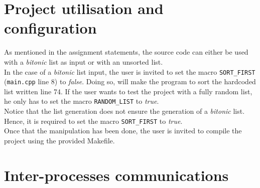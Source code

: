 \documentclass[a4paper,11pt]{article}
\begin{document}
\section{Project utilisation and configuration}

  As mentioned in the assignment statements, the source code can either be used with a \textit{bitonic} list as input or with an unsorted list.\\
  In the case of a \textit{bitonic} list input, the user is invited to set the macro \verb|SORT_FIRST| (\verb|main.cpp| line 8) to \textit{false}. Doing so, will make the program to sort the hardcoded list written line 74. If the user wants to test the project with a fully random list, he only has to set the macro \verb|RANDOM_LIST| to \textit{true}.\\
  Notice that the list generation does not ensure the generation of a \textit{bitonic} list. Hence, it is required to set the macro \verb|SORT_FIRST| to \textit{true}.\\
  Once that the manipulation has been done, the user is invited to compile the project using the provided Makefile.

\section{Inter-processes communications}
\end{document}
